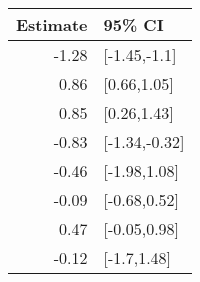 \begin{tabular}{rl}
  \hline
Estimate & 95\% CI \\ 
  \hline
-1.28 & [-1.45,-1.1] \\ 
  0.86 & [0.66,1.05] \\ 
  0.85 & [0.26,1.43] \\ 
  -0.83 & [-1.34,-0.32] \\ 
  -0.46 & [-1.98,1.08] \\ 
  -0.09 & [-0.68,0.52] \\ 
  0.47 & [-0.05,0.98] \\ 
  -0.12 & [-1.7,1.48] \\ 
   \hline
\end{tabular}

